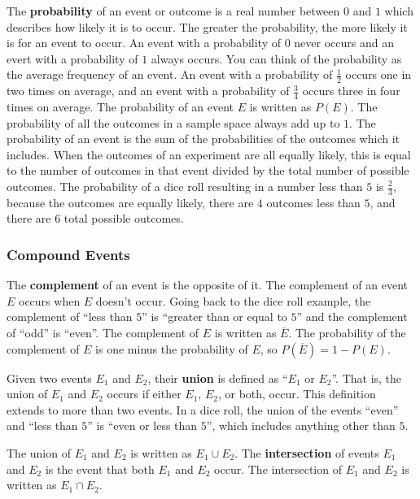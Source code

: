 \documentclass[twocolumn]{article}
\begin{document}
The \textbf{probability} of an event or outcome is a real number between $0$
and $1$ which describes how likely it is to occur. The greater the
probability, the more likely it is for an event to occur. An event with a
probability of $0$ never occurs and an evert with a probability of $1$
always occurs. You can think of the probability as the average frequency of
an event. An event with a probability of $\frac{1}{2}$ occurs one in two
times on average, and an event with a probability of $\frac{3}{4}$ occurs
three in four times on average. The probability of an event $E$ is written
as $P(E)$. The probability of all the outcomes in a sample space always add
up to $1$. The probability of an event is the sum of the probabilities of
the outcomes which it includes. When the outcomes of an experiment are all
equally likely, this is equal to the number of outcomes in that event
divided by the total number of possible outcomes. The probability of a dice
roll resulting in a number less than $5$ is $\frac{2}{3}$, because the
outcomes are equally likely, there are $4$ outcomes less than $5$, and there
are $6$ total possible outcomes.

\subsubsection*{Compound Events}
The \textbf{complement} of an event is the opposite of it. The complement of
an event $E$ occurs when $E$ doesn't occur. Going back to the dice roll
example, the complement of ``less than $5$'' is ``greater than or equal to
$5$'' and the complement of ``odd'' is ``even''. The complement of $E$ is
written as $\overline{E}$. The probability of the complement of $E$ is one
minus the probability of $E$, so $P(\overline{E}) = 1 - P(E)$.

Given two events $E_1$ and $E_2$, their \textbf{union} is defined as ``$E_1$
or $E_2$''. That is, the union of $E_1$ and $E_2$ occurs if either $E_1$,
$E_2$, or both, occur. This definition extends to more than two events.  In
a dice roll, the union of the events ``even'' and ``less than $5$'' is
``even or less than $5$'', which includes anything other than $5$.

The union of $E_1$ and $E_2$ is written as $E_1 \cup E_2$. The
\textbf{intersection} of events $E_1$ and $E_2$ is the event that both $E_1$
and $E_2$ occur. The intersection of $E_1$ and $E_2$ is written as $E_1 \cap
E_2$.
\end{document}
